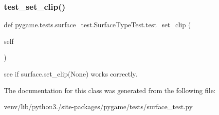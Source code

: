\subsubsection{\texorpdfstring{test\+\_\+set\+\_\+clip()}{test\_set\_clip()}}
{\footnotesize\ttfamily def pygame.\+tests.\+surface\+\_\+test.\+Surface\+Type\+Test.\+test\+\_\+set\+\_\+clip (\begin{DoxyParamCaption}\item[{}]{self }\end{DoxyParamCaption})}

\begin{DoxyVerb}see if surface.set_clip(None) works correctly.
\end{DoxyVerb}
 

The documentation for this class was generated from the following file\+:\begin{DoxyCompactItemize}
\item 
venv/lib/python3./site-\/packages/pygame/tests/surface\+\_\+test.\+py\end{DoxyCompactItemize}
